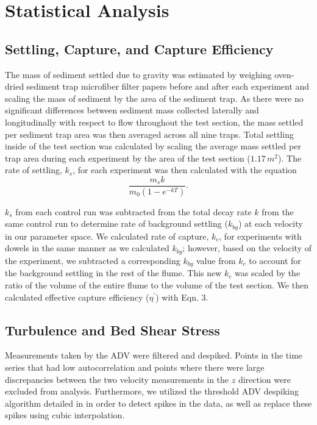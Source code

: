 \documentclass{scrreprt}
\begin{document}
\section{Statistical Analysis}

\subsection{Settling, Capture, and Capture Efficiency}
The mass of sediment settled due to gravity was estimated by weighing oven-dried sediment trap microfiber filter papers before and after each experiment and scaling the mass of sediment by the area of the sediment trap. As there were no significant differences between sediment mass collected laterally and longitudinally with respect to flow throughout the test section, the mass settled per sediment trap area was then averaged across all nine traps. Total settling inside of the test section was calculated by scaling the average mass settled per trap area during each experiment by the area of the test section ($1.17\, m^{2}$). The rate of settling, $k_{s}$, for each experiment was then calculated with the equation \[\frac{m_{s}k}{m_{0}(1-e^{-kT})}.\] 

$k_{s}$ from each control run was subtracted from the total decay rate $k$ from the same control run to determine rate of background settling ($k_{bg}$) at each velocity in our parameter space. We calculated rate of capture, $k_{c}$, for experiments with dowels in the same manner as we calculated $k_{bg}$; however, based on the velocity of the experiment, we subtracted a corresponding $k_{bg}$ value from $k_{c}$ to account for the background settling in the rest of the flume. This new $k_{c}$ was scaled by the ratio of the volume of the entire flume to the volume of the test section. We then calculated effective capture efficiency ($\eta^{\prime}$) with Eqn. 3. 

\subsection{Turbulence and Bed Shear Stress}
Measurements taken by the ADV were filtered and despiked. Points in the time series that had low autocorrelation and points where there were large discrepancies between the two velocity measurements in the $z$ direction were excluded from analysis. Furthermore, we utilized the threshold ADV despiking algorithm detailed in \cite{goring_nikora} in order to detect spikes in the data, as well as replace these spikes using cubic interpolation.
\end{document}
